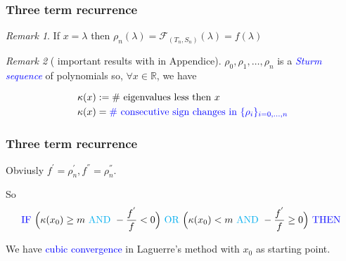 \documentclass{beamer}
\newcommand{\R}{\mathbb{R}}
\newcommand{\effe}[2]{\mathcal{F}_{#1}(#2)}
\theoremstyle{definition} \newtheorem{de}{Def}
\theoremstyle{remark} \newtheorem{os}[de]{Remark}
\theoremstyle{plain} \newtheorem{te}[de]{Teo}
\theoremstyle{plain} \newtheorem{co}[de]{Cor}
\theoremstyle{plain} \newtheorem{pr}[de]{Prop}
\theoremstyle{plain} \newtheorem{lem}[de]{Lemm}
\theoremstyle{remark} \newtheorem{rem}[de]{Remark}
\begin{document}
\begin{frame}[label=BeforeSturmSequence]
  \frametitle{Three term recurrence}

  \begin{os}
    If $x = \lambda$ then $\rho_n(\lambda)=\effe{(T_n,S_n)}{\lambda}=f(\lambda)$
  \end{os}

  \begin{os}[ important results with \hyperlink{SturmSequence}{} in Appendice]
    $\rho_0,\rho_1,\dots,\rho_n$ is a \textcolor{blue}{\emph{Sturm sequence}} of polynomials so, $\forall x\in\R$, we have

    \begin{align*}
      \kappa(x) &:= \text{\# eigenvalues less then } x \\
      \kappa(x) &= \textcolor{blue}{ \text{\# consecutive sign changes in } \{ \rho_i \}_{i=0,\dots,n} }
    \end{align*}
  \end{os}

  
\end{frame}

\begin{frame}
  \frametitle{Three term recurrence}

  Obviusly $f^{'}=\rho_n^{'},f^{''}=\rho_n^{''}$.



  \pause

  So 
  \begin{equation*}
    \textcolor{blue}{\text{IF }} \Big( \kappa(x_0)\ge m \textcolor{cyan}{\text{ AND }} -\frac{f^{'}}{f}< 0 \Big) \textcolor{cyan}{\text{ OR }} \Big( \kappa(x_0) < m \textcolor{cyan}{\text{ AND }} -\frac{f^{'}}{f}\ge 0 \Big) \textcolor{blue}{\text{ THEN }}
  \end{equation*}

  \pause

  We have \textcolor{blue}{cubic convergence} in Laguerre's method with $x_0$ as starting point.

\end{frame}
\end{document}
